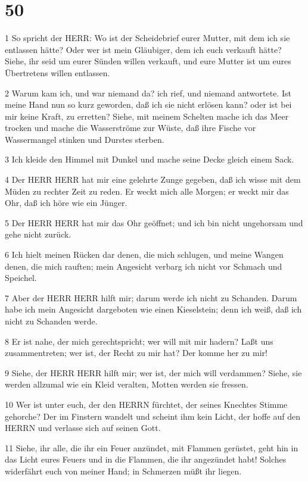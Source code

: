 \chapter{50}

\par 1 So spricht der HERR: Wo ist der Scheidebrief eurer Mutter, mit dem ich sie entlassen hätte? Oder wer ist mein Gläubiger, dem ich euch verkauft hätte? Siehe, ihr seid um eurer Sünden willen verkauft, und eure Mutter ist um eures Übertretens willen entlassen.
\par 2 Warum kam ich, und war niemand da? ich rief, und niemand antwortete. Ist meine Hand nun so kurz geworden, daß ich sie nicht erlösen kann? oder ist bei mir keine Kraft, zu erretten? Siehe, mit meinem Schelten mache ich das Meer trocken und mache die Wasserströme zur Wüste, daß ihre Fische vor Wassermangel stinken und Durstes sterben.
\par 3 Ich kleide den Himmel mit Dunkel und mache seine Decke gleich einem Sack.
\par 4 Der HERR HERR hat mir eine gelehrte Zunge gegeben, daß ich wisse mit dem Müden zu rechter Zeit zu reden. Er weckt mich alle Morgen; er weckt mir das Ohr, daß ich höre wie ein Jünger.
\par 5 Der HERR HERR hat mir das Ohr geöffnet; und ich bin nicht ungehorsam und gehe nicht zurück.
\par 6 Ich hielt meinen Rücken dar denen, die mich schlugen, und meine Wangen denen, die mich rauften; mein Angesicht verbarg ich nicht vor Schmach und Speichel.
\par 7 Aber der HERR HERR hilft mir; darum werde ich nicht zu Schanden. Darum habe ich mein Angesicht dargeboten wie einen Kieselstein; denn ich weiß, daß ich nicht zu Schanden werde.
\par 8 Er ist nahe, der mich gerechtspricht; wer will mit mir hadern? Laßt uns zusammentreten; wer ist, der Recht zu mir hat? Der komme her zu mir!
\par 9 Siehe, der HERR HERR hilft mir; wer ist, der mich will verdammen? Siehe, sie werden allzumal wie ein Kleid veralten, Motten werden sie fressen.
\par 10 Wer ist unter euch, der den HERRN fürchtet, der seines Knechtes Stimme gehorche? Der im Finstern wandelt und scheint ihm kein Licht, der hoffe auf den HERRN und verlasse sich auf seinen Gott.
\par 11 Siehe, ihr alle, die ihr ein Feuer anzündet, mit Flammen gerüstet, geht hin in das Licht eures Feuers und in die Flammen, die ihr angezündet habt! Solches widerfährt euch von meiner Hand; in Schmerzen müßt ihr liegen.

